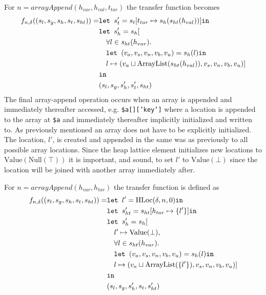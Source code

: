 For $n = \mathit{arrayAppend}(h_{var}, h_{val},t_{tar})$ the transfer function becomes
\begin{align}
    f_{n,\delta}((s_l, s_g, s_h, s_t, s_{ht})) = &\texttt{let } s_t' = s_t[t_{tar}\mapsto s_h(s_{ht}(h_{val}))] \texttt{in }\notag\\
                              &\texttt{let } s_h' = s_h[\notag\\
                              &\quad \forall l \in s_{ht}(h_{var}).\notag\\
                              &\quad\texttt{let } (v_a,v_s,v_n,v_b,v_u) = s_h(l) \texttt{in } \notag\\
                              &\quad l\mapsto (v_a \sqcup \text{ArrayList}(s_{ht}(h_{val})), v_s, v_n, v_b, v_u)]\notag\\
                              & \texttt{in }\notag\\
                              &(s_l, s_g, s_h', s_t', s_{ht})
\end{align}
The final array-append operation occurs when an array is appended and immediately thereafter accessed, e.g. \texttt{\$a[]['key']} where a location is appended to the array at \texttt{\$a} and immediately  thereafter implicitly initialized and written to. As previously mentioned an array does not have to be explicitly initialized. The location, $l'$, is created and appended in the same was as previously to all possible array locations. Since the heap lattice element initializes new locations to $\text{Value}(\text{Null}(\top))$ it is important, and sound, to set $l'$ to $\text{Value}(\bot)$ since the location will be joined with another array immediately after. 

For $n = \mathit{arrayAppend}(h_{var}, h_{tar})$ the transfer function is defined as
\begin{align}
    f_{n,\delta}((s_l, s_g, s_h, s_t, s_{ht})) = &\texttt{let } l' = \text{HLoc}(\delta, n, 0) \texttt{in }\notag\\
                              &\texttt{let } s_{ht}' = s_{ht}[h_{tar} \mapsto \{l'\}] \texttt{in }\notag\\
                              &\texttt{let } s_h' = s_h[\notag\\
                              &\quad l' \mapsto \text{Value}(\bot), \notag\\
                              &\quad \forall l \in s_{ht}(h_{var}).\notag\\
                              &\quad\texttt{let } (v_a,v_s,v_n,v_b,v_u) = s_h(l) \texttt{in } \notag\\
                              &\quad l\mapsto (v_a \sqcup \text{ArrayList}(\{l'\}), v_s, v_n, v_b, v_u)]\notag\\
                              & \texttt{in }\notag\\
                              &(s_l, s_g, s_h', s_t, s_{ht}')
\end{align}
\begin{comment}
\begin{program}
\centering
\begin{lstlisting}
$a = [];
$a[]["foo"] = 42;
\end{lstlisting}
\caption{Array append before write}
\label{lst:appendbefw}
\end{program}
\end{comment}
